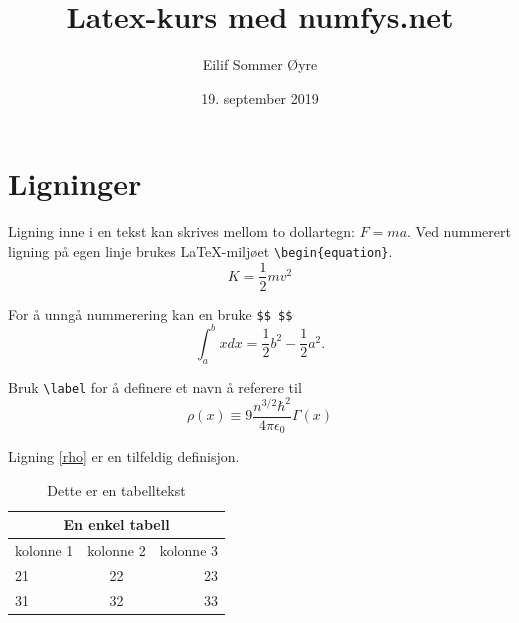 \documentclass{article}
\title{Latex-kurs med numfys.net}
\author{Eilif Sommer Øyre}
\date{19. september 2019}
\begin{document}
\maketitle

\section{Ligninger}

Ligning inne i en tekst kan skrives mellom to dollartegn: $F = ma$. Ved nummerert ligning på egen linje brukes \LaTeX-miljøet \texttt{\textbackslash begin\{equation\}}.
\begin{equation}
K = \frac{1}{2}mv^2
\end{equation}

For å unngå nummerering kan en bruke \texttt{\$\$ \$\$}
$$ \int_a^b x dx = \frac{1}{2}b^2 - \frac{1}{2}a^2 .$$

Bruk \texttt{\textbackslash label} for å definere et navn å referere til
\begin{equation}
\rho(x) \equiv 9\frac{n^{3/2} \hbar^2}{4\pi \epsilon_0} \Gamma(x)
\label{rho}
\end{equation}

Ligning \eqref{rho} er en tilfeldig definisjon.

\begin{table}[h] %
\centering
\begin{tabular}{| l | c | r |} %
\hline %
\multicolumn{3}{|c|}{En enkel tabell} \\ %
\hline
kolonne 1 & kolonne 2 & kolonne 3 \\
\hline
\hline
21 & 22 & 23 \\
31 & 32 & 33 \\
\hline
\end{tabular}
\caption{Dette er en tabelltekst}
\label{tabell:1}
\end{table}


\listoftables
\newpage
\end{document}
